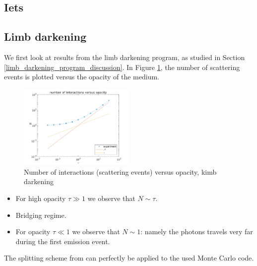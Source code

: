 \documentclass[../main/main.tex]{subfiles}
\begin{document}
\newpage
\subsection{Iets}

\newpage
\subsection{Limb darkening} We first look at results from the limb darkening program, as studied in Section \ref{limb_darkening_program_discussion}. In Figure \ref{limb_darkening_N_vs_tau}, the number of scattering events is plotted versus the opacity of the medium. 

	\begin{figure}[!htp]
	\centering
	\includegraphics[width=0.5\textwidth]{../../introductory_exercises/limb_darkening/data/N_vs_opacity.png}
	\caption{Number of interactions (scattering events) versus 	opacity, kimb darkening}
	\label{limb_darkening_N_vs_tau}
	\end{figure}

\begin{itemize}
\item For high opacity $\tau \gg 1$ we observe that $N \sim \tau$. \item Bridging regime.
\item For opacity $\tau \ll 1$ we observe that $N \sim 1$: namely the photons travels very far during the first emission event.
\end{itemize}

The splitting scheme from \cite{Dimarco2018} can perfectly be applied to the used Monte Carlo code.


\noindent{}
\end{document}
